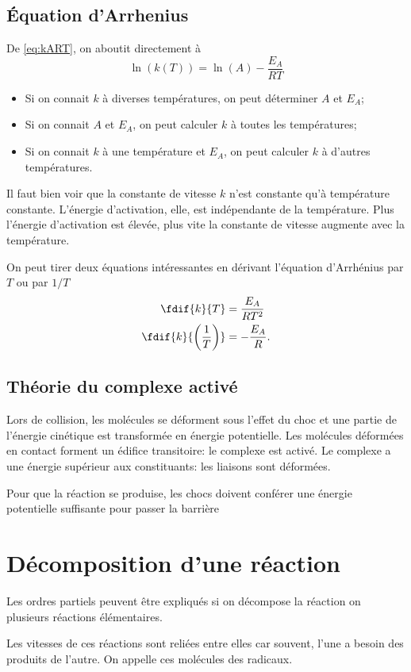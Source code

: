 \subsection{Équation d'Arrhenius}
De \eqref{eq:kART}, on aboutit directement à
\[ \ln(k(T)) = \ln(A)-\frac{E_A}{RT} \]
\begin{itemize}
  \item Si on connait $k$ à diverses températures,
    on peut déterminer $A$ et $E_A$;
  \item Si on connait $A$ et $E_A$,
    on peut calculer $k$ à toutes les températures;
  \item Si on connait $k$ à une température et $E_A$,
    on peut calculer $k$ à d'autres températures.
\end{itemize}
Il faut bien voir que la constante de vitesse $k$
n'est constante qu'à température constante.
L'énergie d'activation, elle, est indépendante de la température.
Plus l'énergie d'activation est élevée,
plus vite la constante de vitesse augmente
avec la température.

On peut tirer deux équations intéressantes en dérivant
l'équation d'Arrhénius par $T$ ou par $1/T$
\begin{align*}
  \fdif{k}{T} & = \frac{E_A}{RT^2}\\
  \fdif{k}{\left(\frac{1}{T}\right)} & = -\frac{E_A}{R}.
\end{align*}

\subsection{Théorie du complexe activé}
Lors de collision, les molécules se déforment sous l'effet du choc et
une partie de l'énergie cinétique est transformée en énergie potentielle.
Les molécules déformées en contact forment un édifice transitoire:
le complexe est activé.
Le complexe a une énergie supérieur aux constituants:
les liaisons sont déformées.

Pour que la réaction se produise,
les chocs doivent conférer une énergie potentielle
suffisante pour passer la barrière

\section{Décomposition d'une réaction}
Les ordres partiels peuvent être expliqués si on décompose
la réaction on plusieurs réactions élémentaires.

Les vitesses de ces réactions sont reliées entre elles car souvent,
l'une a besoin des produits de l'autre.
On appelle ces molécules des radicaux.

